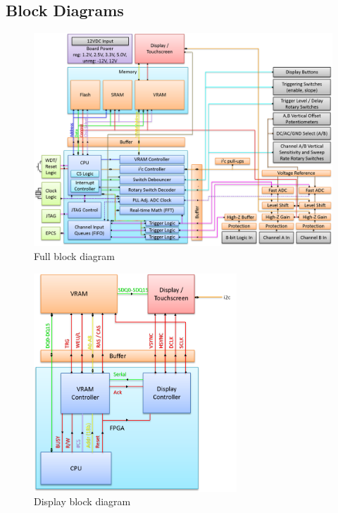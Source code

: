 \begin{appendices}

\chapter{Block Diagrams} \label{App:blockdiagrams}

\begin{figure}[ht!]
    \centering
    \includegraphics[width=6in]{block_diagrams/full.png}
		\caption{Full block diagram}
\end{figure}

\begin{figure}[ht!]
    \centering
    \includegraphics[width=3in]{block_diagrams/video.png}
		\caption{Display block diagram}
\end{figure}


\end{appendices}
